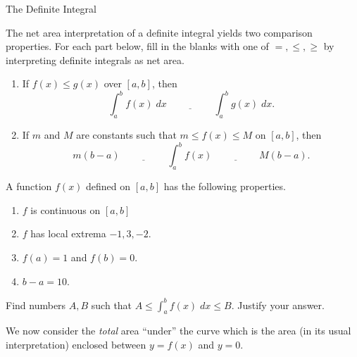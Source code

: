 \documentclass[../main.tex]{subfiles}
\begin{document}
\begin{lesson}{The Definite Integral}
\begin{example}
  \end{example}

  \clearpage

  The net area interpretation of a definite integral yields two comparison properties. For each part below, fill in the blanks with one of \(=, \le , \ge\) by interpreting definite integrals as net area.
  \begin{enumerate}
    \item If \(f(x) \le g(x)\) over \([a,b]\), then
      \[
        \int_{a}^{b} f(x) \;dx \underline{\hspace{2cm}} \int_{a}^{b} g(x) \;dx.
      \]

    \item If \(m\) and \(M\) are constants such that \(m \le f(x) \le M\) on \([a,b]\), then
      \[
        m(b-a) \underline{\hspace{2cm}} \int_{a}^{b} f(x) \underline{\hspace{2cm}} M(b-a).
      \]
  \end{enumerate}

  \begin{example}
    A function \(f(x)\) defined on \([a,b]\) has the following properties. 
    \begin{enumerate}
      \item \(f\) is continuous on \([a,b]\)
      \item \(f\) has local extrema \(-1, 3, -2\). 
      \item \(f(a) = 1\) and \(f(b) = 0\).
      \item \(b - a = 10\).
    \end{enumerate}

    Find numbers \(A,B\) such that \(A \le \int_{a}^{b} f(x) \;dx \le B\). Justify your answer. 
  \end{example}
  \clearpage
 
  We now consider the \emph{total} area ``under'' the curve which is the area (in its usual interpretation) enclosed between \(y = f(x)\) and \(y = 0\).



\end{lesson}
\end{document}
